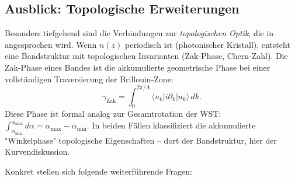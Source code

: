 ﻿\documentclass[12pt, a4paper]{article}
\theoremstyle{definition}
\begin{document}
	\subsection{Ausblick: Topologische Erweiterungen}
	
	Besonders tiefgehend sind die Verbindungen zur \emph{topologischen Optik},
	die in \cite{oqtum} angesprochen wird. Wenn $n(z)$ periodisch ist (photonischer
	Kristall), entsteht eine Bandstruktur mit topologischen Invarianten (Zak-Phase,
	Chern-Zahl). Die Zak-Phase eines Bandes ist die akkumulierte geometrische
	Phase bei einer vollständigen Traversierung der Brillouin-Zone:
	\[
	\gamma_\mathrm{Zak} = \int_0^{2\pi/\Lambda} \langle u_k | i\partial_k | u_k \rangle\, dk.
	\]
	Diese Phase ist formal analog zur Gesamtrotation der WST:
	$\int_{\alpha_\mathrm{min}}^{\alpha_\mathrm{max}} d\alpha = \alpha_\mathrm{max} - \alpha_\mathrm{min}$.
	In beiden Fällen klassifiziert die akkumulierte "Winkelphase" topologische
	Eigenschaften -- dort der Bandstruktur, hier der Kurvendiskussion.
	
	Konkret stellen sich folgende weiterführende Fragen:
	
\end{document}
